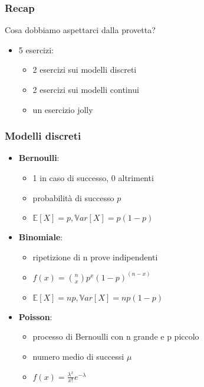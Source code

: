 \documentclass{beamer}
\date[18/05/2023]{18 maggio 2023}
\begin{document}
\frame{\titlepage}

\begin{frame}
	\frametitle{Recap}
	Cosa dobbiamo aspettarci dalla provetta?

	\begin{itemize}
		\item 5 esercizi:
		 \begin{itemize}
			      \item 2 esercizi sui modelli discreti
			      \item 2 esercizi sui modelli continui
			      \item un esercizio jolly
		      \end{itemize}
	\end{itemize}
\end{frame}

\begin{frame}[fragile]
	\frametitle{Modelli discreti}

	\begin{itemize}
		\item \textbf{Bernoulli}: \begin{itemize}
			      \item 1 in caso di successo, 0 altrimenti
			      \item probabilità di successo $p$
			      \item $\mathbb{E}[X] = p, \mathbb{V}ar[X] = p\left(1-p\right)$
		      \end{itemize}
		\item \textbf{Binomiale}: \begin{itemize}
			      \item ripetizione di n prove indipendenti
			      \item $f(x) = \binom{n}{x} p^x (1-p)^{(n-x)}$
			      \item $\mathbb{E}[X] = n p, \mathbb{V}ar[X] = n p (1-p)$
		      \end{itemize}
		\item \textbf{Poisson}: \begin{itemize}
			      \item processo di Bernoulli con n grande e p piccolo
			      \item numero medio di successi $\mu$
			            \item$f(x) = \frac{\lambda^x}{x!} e^{-\lambda}$
		      \end{itemize}
	\end{itemize}
\end{frame}
\end{document}
